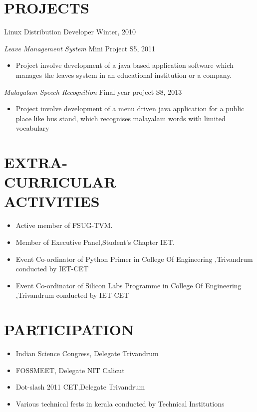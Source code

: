 \documentclass[line,margin]{res}
\begin{document}
\begin{resume}
\section{PROJECTS} Linux Distribution Developer  \hfill Winter, 2010 
  
  {\sl  Leave Management System} \hfill      Mini Project S5, 2011      
   \begin{itemize}  \itemsep -2pt %
   \item 
     Project involve development of a java based application software which manages the leaves system in an educational institution or a company. 
   \end{itemize} 

  {\sl Malayalam Speech Recognition} \hfill      Final year project S8, 2013      
   \begin{itemize}  \itemsep -2pt %
   \item 
    Project involve development of a menu driven java application for a public place like bus stand, which recognises malayalam words with limited vocabulary

 \end{itemize}

    
  	
\section{EXTRA-\\CURRICULAR \\ ACTIVITIES}     
\begin{itemize}  \itemsep -2pt %
\item    Active member of FSUG-TVM.
\item     Member of Executive Panel,Student's Chapter IET.
\item Event Co-ordinator of Python Primer in College Of Engineering ,Trivandrum conducted by  IET-CET
\item Event Co-ordinator of Silicon Labs Programme in College Of Engineering ,Trivandrum conducted by IET-CET
\end{itemize}

\section{PARTICIPATION}
\begin{itemize}  \itemsep -2pt %
\item   Indian Science Congress, Delegate  \hfill Trivandrum 
\item   FOSSMEET, Delegate  \hfill NIT Calicut
\item   Dot-slash 2011 CET,Delegate     \hfill Trivandrum
\item   Various technical fests in kerala conducted by Technical Institutions
\end{itemize}



\end{resume}
\end{document}
